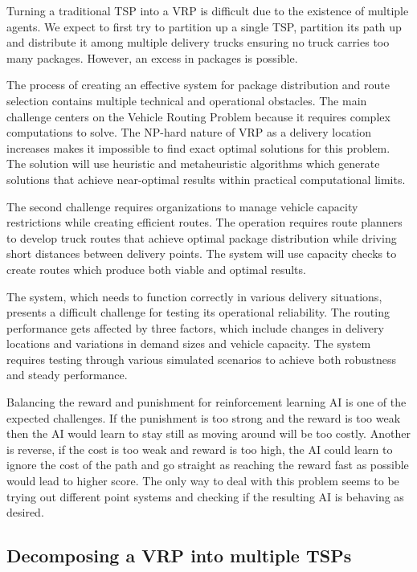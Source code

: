 \documentclass[conference]{IEEEtran}
\begin{document}
Turning a traditional TSP into a VRP is difficult due to the existence of multiple agents. We expect to first try to partition up a single TSP, partition its path up and distribute it among multiple delivery trucks ensuring no truck carries too many packages. However, an excess in packages is possible.

The process of creating an effective system for package distribution and route selection contains multiple technical and operational obstacles. The main challenge centers on the Vehicle Routing Problem because it requires complex computations to solve. The NP-hard nature of VRP as a delivery location increases makes it impossible to find exact optimal solutions for this problem. The solution will use heuristic and metaheuristic algorithms which generate solutions that achieve near-optimal results within practical computational limits.

The second challenge requires organizations to manage vehicle capacity restrictions while creating efficient routes. The operation requires route planners to develop truck routes that achieve optimal package distribution while driving short distances between delivery points. The system will use capacity checks to create routes which produce both viable and optimal results.

The system, which needs to function correctly in various delivery situations, presents a difficult challenge for testing its operational reliability. The routing performance gets affected by three factors, which include changes in delivery locations and variations in demand sizes and vehicle capacity. The system requires testing through various simulated scenarios to achieve both robustness and steady performance.

Balancing the reward and punishment for reinforcement learning AI is one of the expected challenges. If the punishment is too strong and the reward is too weak then the AI would learn to stay still as moving around will be too costly. Another is reverse, if the cost is too weak and reward is too high, the AI could learn to ignore the cost of the path and go straight as reaching the reward fast as possible would lead to higher score. The only way to deal with this problem seems to be trying out different point systems and checking if the resulting AI is behaving as desired.

\subsection{Decomposing a VRP into multiple TSPs}
\end{document}
